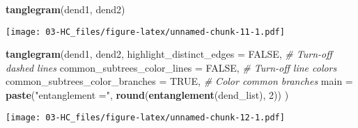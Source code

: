 \documentclass[
]{elegantbook}
\newenvironment{Shaded}{\begin{snugshade}}{\end{snugshade}}
\newcommand{\AttributeTok}[1]{\textcolor[rgb]{0.13,0.29,0.53}{#1}}
\newcommand{\CommentTok}[1]{\textcolor[rgb]{0.56,0.35,0.01}{\textit{#1}}}
\newcommand{\ConstantTok}[1]{\textcolor[rgb]{0.56,0.35,0.01}{#1}}
\newcommand{\DecValTok}[1]{\textcolor[rgb]{0.00,0.00,0.81}{#1}}
\newcommand{\FunctionTok}[1]{\textcolor[rgb]{0.13,0.29,0.53}{\textbf{#1}}}
\newcommand{\NormalTok}[1]{#1}
\newcommand{\StringTok}[1]{\textcolor[rgb]{0.31,0.60,0.02}{#1}}
\begin{document}
\begin{Shaded}
\begin{Highlighting}[]
\FunctionTok{tanglegram}\NormalTok{(dend1, dend2)}
\end{Highlighting}
\end{Shaded}

\texttt{[image: 03-HC\_files/figure-latex/unnamed-chunk-11-1.pdf]}

\begin{Shaded}
\begin{Highlighting}[]
\FunctionTok{tanglegram}\NormalTok{(dend1, dend2,}
\AttributeTok{highlight\_distinct\_edges =} \ConstantTok{FALSE}\NormalTok{, }\CommentTok{\# Turn{-}off dashed lines}
\AttributeTok{common\_subtrees\_color\_lines =} \ConstantTok{FALSE}\NormalTok{, }\CommentTok{\# Turn{-}off line colors}
\AttributeTok{common\_subtrees\_color\_branches =} \ConstantTok{TRUE}\NormalTok{, }\CommentTok{\# Color common branches}
\AttributeTok{main =} \FunctionTok{paste}\NormalTok{(}\StringTok{"entanglement ="}\NormalTok{, }\FunctionTok{round}\NormalTok{(}\FunctionTok{entanglement}\NormalTok{(dend\_list), }\DecValTok{2}\NormalTok{))}
\NormalTok{)}
\end{Highlighting}
\end{Shaded}

\texttt{[image: 03-HC\_files/figure-latex/unnamed-chunk-12-1.pdf]}
\end{document}
